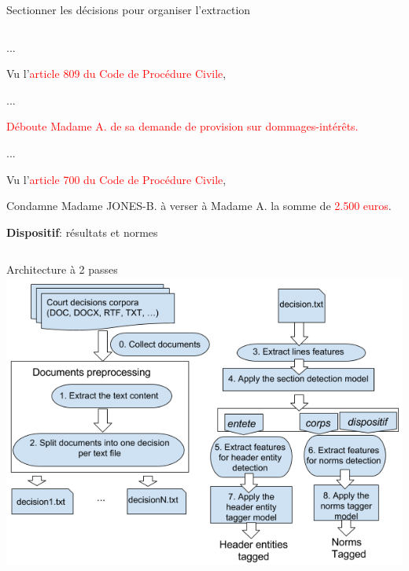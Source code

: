 \documentclass[newPxFont,pagenumber]{beamer}
\begin{document}
\begin{frame}{Sectionner les décisions pour organiser l'extraction}
\begin{columns}
\begin{column}{.55\linewidth}
{\begin{minipage}{\textwidth}
...

Vu l'\textcolor{red}{article 809 du Code de Procédure Civile},

...

\textcolor{red}{Déboute Madame A. de sa demande de provision sur dommages-intérêts.}

...

Vu l'\textcolor{red}{article 700 du Code de Procédure Civile},

Condamne Madame JONES-B. à verser à Madame A. la somme de \textcolor{red}{2.500 euros}.
\end{minipage}}
\vspace{0.1cm}

{\normalsize \textbf{Dispositif}: résultats et normes}

\end{column}
\end{columns}
\end{frame}

\begin{frame}{Architecture à 2 passes}
\includegraphics [width=\textwidth]{archAppli.png}
\end{frame}
\end{document}
